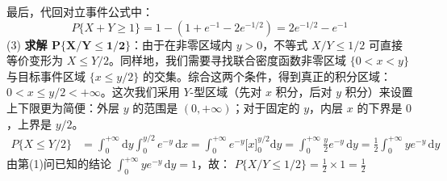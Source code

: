 \documentclass[lang=cn,11pt]{elegantbook}
\begin{document}
\begin{solution}
最后，代回对立事件公式中：
\[
P\{X+Y \geqslant 1\} = 1 - \left( 1 + e^{-1} - 2e^{-1/2} \right) = 2e^{-1/2} - e^{-1}
\]
(3) \textbf{求解 $\mathbf{P\{X/Y \leqslant 1/2\}}$}：由于在非零区域内 $y > 0$，不等式 $X/Y \leqslant 1/2$ 可直接等价变形为 $X \leqslant Y/2$。同样地，我们需要寻找联合密度函数非零区域 $\{0 < x < y\}$ 与目标事件区域 $\{x \leqslant y/2\}$ 的交集。综合这两个条件，得到真正的积分区域：$0 < x \leqslant y/2 < +\infty$。这次我们采用 $Y$-型区域（先对 $x$ 积分，后对 $y$ 积分）来设置上下限更为简便：外层 $y$ 的范围是 $(0, +\infty)$；对于固定的 $y$，内层 $x$ 的下界是 $0$，上界是 $y/2$。
\begin{align*}
P\{X \leqslant Y/2\} &= \int_{0}^{+\infty} \mathrm{d}y \int_{0}^{y/2} e^{-y} \,\mathrm{d}x = \int_{0}^{+\infty} e^{-y} \Big[ x \Big]_{0}^{y/2} \mathrm{d}y = \int_{0}^{+\infty} \frac{y}{2} e^{-y} \,\mathrm{d}y = \frac{1}{2} \int_{0}^{+\infty} y e^{-y} \,\mathrm{d}y
\end{align*}
由第(1)问已知的结论 $\int_{0}^{+\infty} y e^{-y} \,\mathrm{d}y = 1$，故：
\(
P\{X/Y \leqslant 1/2\} = \frac{1}{2} \times 1 = \frac{1}{2}
\)
\end{solution}
\end{document}

